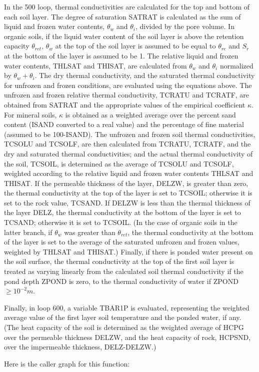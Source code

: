 In the 500 loop, thermal conductivities are calculated for the top and bottom of each soil layer. The degree of saturation S\+A\+T\+R\+A\+T is calculated as the sum of liquid and frozen water contents, $\theta_w$ and $\theta_i$, divided by the pore volume. In organic soils, if the liquid water content of the soil layer is above the retention capacity $\theta_{ret}$, $\theta_w$ at the top of the soil layer is assumed to be equal to $\theta_{re}$ and $S_r$ at the bottom of the layer is assumed to be 1. The relative liquid and frozen water contents, T\+H\+L\+S\+A\+T and T\+H\+I\+S\+A\+T, are calculated from $\theta_w$ and $\theta_i$ normalized by $\theta_w + \theta_i$. The dry thermal conductivity, and the saturated thermal conductivity for unfrozen and frozen conditions, are evaluated using the equations above. The unfrozen and frozen relative thermal conductivity, T\+C\+R\+A\+T\+U and T\+C\+R\+A\+T\+F, are obtained from S\+A\+T\+R\+A\+T and the appropriate values of the empirical coefficient $\kappa$. For mineral soils, $\kappa$ is obtained as a weighted average over the percent sand content (I\+S\+A\+N\+D converted to a real value) and the percentage of fine material (assumed to be 100-\/\+I\+S\+A\+N\+D). The unfrozen and frozen soil thermal conductivities, T\+C\+S\+O\+L\+U and T\+C\+S\+O\+L\+F, are then calculated from T\+C\+R\+A\+T\+U, T\+C\+R\+A\+T\+F, and the dry and saturated thermal conductivities; and the actual thermal conductivity of the soil, T\+C\+S\+O\+I\+L, is determined as the average of T\+C\+S\+O\+L\+U and T\+C\+S\+O\+L\+F, weighted according to the relative liquid and frozen water contents T\+H\+L\+S\+A\+T and T\+H\+I\+S\+A\+T. If the permeable thickness of the layer, D\+E\+L\+Z\+W, is greater than zero, the thermal conductivity at the top of the layer is set to T\+C\+S\+O\+I\+L; otherwise it is set to the rock value, T\+C\+S\+A\+N\+D. If D\+E\+L\+Z\+W is less than the thermal thickness of the layer D\+E\+L\+Z, the thermal conductivity at the bottom of the layer is set to T\+C\+S\+A\+N\+D; otherwise it is set to T\+C\+S\+O\+I\+L. (In the case of organic soils in the latter branch, if $\theta_w$ was greater than $\theta_{ret}$, the thermal conductivity at the bottom of the layer is set to the average of the saturated unfrozen and frozen values, weighted by T\+H\+L\+S\+A\+T and T\+H\+I\+S\+A\+T.) Finally, if there is ponded water present on the soil surface, the thermal conductivity at the top of the first soil layer is treated as varying linearly from the calculated soil thermal conductivity if the pond depth Z\+P\+O\+N\+D is zero, to the thermal conductivity of water if Z\+P\+O\+N\+D $\geq 10^{-2} m$.

Finally, in loop 600, a variable T\+B\+A\+R1\+P is evaluated, representing the weighted average value of the first layer soil temperature and the ponded water, if any. (The heat capacity of the soil is determined as the weighted average of H\+C\+P\+G over the permeable thickness D\+E\+L\+Z\+W, and the heat capacity of rock, H\+C\+P\+S\+N\+D, over the impermeable thickness, D\+E\+L\+Z-\/\+D\+E\+L\+Z\+W.)

Here is the caller graph for this function\+:


